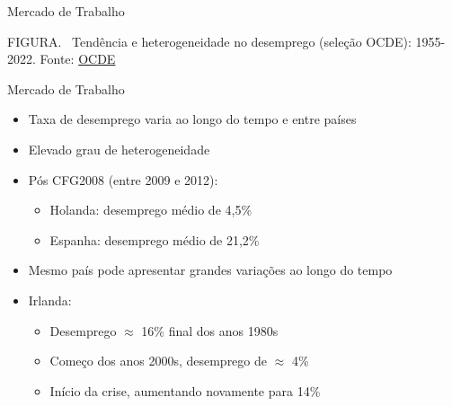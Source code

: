 \documentclass[10pt]{beamer}
\begin{document}
\begin{frame}{Mercado de Trabalho}
    \begin{center}
		\begin{minipage}[b]{.9\textwidth}
			\tiny{{\scshape FIGURA}. \ Tendência e heterogeneidade no desemprego (seleção OCDE): 1955-2022. Fonte: \href{https://data.oecd.org/chart/6Rq2}{OCDE}} 
		\end{minipage}
	\end{center}
\end{frame}

\begin{frame}{Mercado de Trabalho}
    \begin{itemize}
        \item Taxa de desemprego varia ao longo do tempo e entre países\bigskip
        \item Elevado grau de heterogeneidade\bigskip
        \item Pós CFG2008 (entre 2009 e 2012):\medskip
            \begin{itemize}
                \item Holanda: desemprego médio de 4,5\%\medskip
                \item Espanha: desemprego médio de 21,2\%\bigskip
            \end{itemize}
        \item Mesmo país pode apresentar grandes variações ao longo do tempo\bigskip
        \item Irlanda:\medskip
        \begin{itemize}
            \item Desemprego $\approx$ 16\% final dos anos 1980s\medskip
            \item Começo dos anos 2000s, desemprego de $\approx$ 4\%\medskip
            \item Início da crise, aumentando novamente para 14\%
        \end{itemize}
    \end{itemize}
\end{frame}
\end{document}
